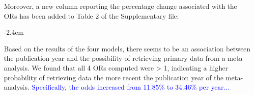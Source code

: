 \documentclass[draft]{article}
\renewenvironment{quote}{\begin{fquote}\advance\leftmargini -2.4em\begin{oldquote}}{\end{oldquote}\end{fquote}}
\newenvironment{fquote}
  {\def\FrameCommand{
	\fboxsep=0.6em %
	\fcolorbox{black}{white}}%
    \MakeFramed {\advance\hsize-2\width \FrameRestore}
    \begin{minipage}{\linewidth}
  }
  {\end{minipage}\endMakeFramed}
\begin{document}
Moreover, a new column reporting the percentage change associated with the ORs has been added to Table 2 of the Supplementary file:

\begin{quote}
Based on the results of the four models, there seems to be an association between the publication year and the possibility of retrieving primary data from a meta-analysis. We found that all 4 ORs computed were \textgreater{} 1, indicating a higher probability of retrieving data the more recent the publication year of the meta-analysis. \textcolor{blue}{Specifically, the odds increased from 11.85\% to 34.46\% per year...}
\end{quote}
\end{document}
